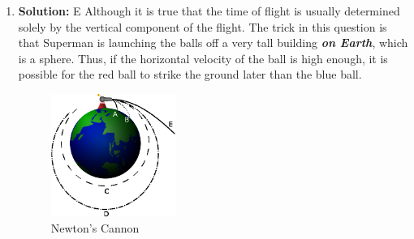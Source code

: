 \documentclass[11pt]{article}
\newcommand{\solution}[1]{\textbf{Solution: } #1 \hspace{5mm}}
\begin{document}
\begin{enumerate}
\begin{enumerate}[label={[\arabic*]}]
			\begin{align*}
				\text{Going up: } &0^2 = u^2+2a_{up}S &\implies u^2 &= -2a_{up}S\\
				\text{Going down: } &v^2=0^2+2a_{down}S &\implies v^2 &= 2a_{down}S  \\
				\because S = \text{constant} \therefore ~&u \propto \sqrt{a_{up}} ~~\text{and}~~v \propto \sqrt{a_{down}}
			\end{align*}
			As explained in [1], $F_{up} > F_{down}$. Thus $a_{up} > a_{down}$, which means that $u > v$.
		\end{enumerate}
		\pagebreak
		\item \solution{E} Although it is true that the time of flight is usually determined  solely by the vertical component of the flight. The trick in this question is that Superman is launching the balls off a very tall building \textbf{\textit{on Earth}}, which is a sphere. Thus, if the horizontal velocity of the ball is high enough, it is possible for the red ball to strike the ground later than the blue ball. 
		\begin{figure}[h]
			\centering
			\includegraphics[height=4cm]{Newton_Cannon.eps}
			\caption{Newton's Cannon}
		\end{figure}
	\end{enumerate}
\end{document}
